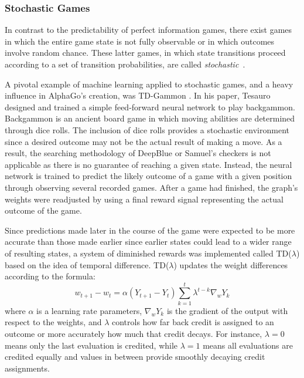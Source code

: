 

\subsubsection*{Stochastic Games}


In contrast to the predictability of perfect information games,
there exist games in which the entire game state is not fully observable
or in which outcomes involve random chance.
%
These latter games,
in which state transitions
proceed according to a set of transition probabilities,
are called \textit{stochastic}~\cite{stochastic_games}.


A pivotal example of machine learning applied to stochastic games,
and a heavy influence in AlphaGo's creation,
was TD-Gammon
\cite{tdgammon}.
%
In his paper,
Tesauro designed and trained a simple feed-forward neural network to play 
backgammon.
%
Backgammon is an ancient board game in which moving abilities are determined
through dice rolls.
%
The inclusion of dice rolls provides a stochastic environment since
a desired outcome may not be the actual result of making a move.
%
As a result,
the searching methodology of DeepBlue or Samuel's checkers is not applicable
as there is no guarantee of reaching a given state.
%
Instead,
the neural network is trained to predict the likely outcome of a game with a
given position
through observing several recorded games.
%
After a game had finished,
the graph's weights were readjusted by using a final reward signal representing
the actual outcome of the game.

Since predictions made later in the course of the game were expected to be more
accurate than those made earlier
since earlier states could lead to a wider range of resulting states,
a system of diminished rewards was implemented called
TD($\lambda$) based on the idea of temporal difference.
%
TD($\lambda$) updates the weight differences according to the formula:
\[
	w_{t+1} - w_t =
		\alpha (Y_{t+1}-Y_t)
		\sum_{k=1}^t {\lambda^{t-k} \nabla_w Y_k}
\]
where $\alpha$ is a learning rate parameters,
$\nabla_w Y_k$ is the gradient of the output with respect to the weights,
and $\lambda$ controls how far back credit is assigned to an outcome
or more accurately how much that credit decays.
%
For instance,
$\lambda=0$ means only the last evaluation is credited,
while $\lambda=1$ means all evaluations are credited equally
and values in between provide smoothly decaying credit assignments.

